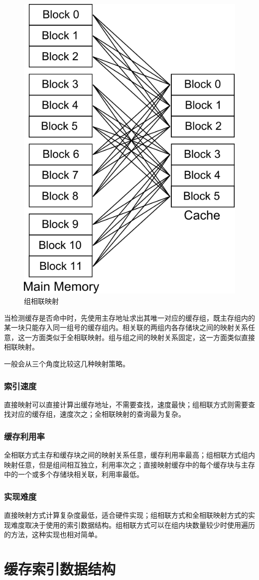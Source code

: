 \begin{figure}[H]
\centering
\includegraphics[width=0.4\linewidth]{./graph/cache-map-3}
\caption{组相联映射}
\label{fig:cache-map-3}
\end{figure}

当检测缓存是否命中时，先使用主存地址求出其唯一对应的缓存组，既主存组内的某一块只能存入同一组号的缓存组内。相关联的两组内各存储块之间的映射关系任意，这一方面类似于全相联映射。组与组之间的映射关系固定，这一方面类似直接相联映射。

一般会从三个角度比较这几种映射策略。
\subsubsection{索引速度}
直接映射可以直接计算出缓存地址，不需要查找，速度最快；组相联方式则需要查找对应的缓存组，速度次之；全相联映射的查询最为复杂。
\subsubsection{缓存利用率}
全相联方式主存和缓存块之间的映射关系任意，缓存利用率最高；组相联方式组内映射任意，但是组间相互独立，利用率次之；直接映射缓存中的每个缓存块与主存中的一个或多个存储块相关联，利用率最低。
\subsubsection{实现难度}
直接映射方式计算复杂度最低，适合硬件实现；组相联方式和全相联映射方式的实现难度取决于使用的索引数据结构。组相联方式可以在组内块数量较少时使用遍历的方法，这种实现也相对简单。

\section{缓存索引数据结构}
\label{sec:cache_indexing}

